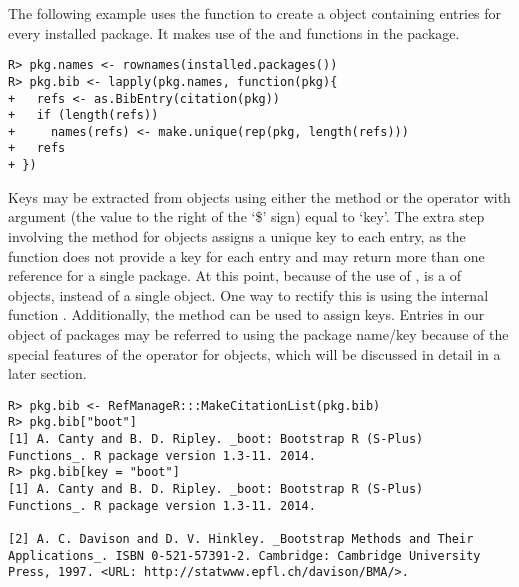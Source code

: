 \documentclass[article]{jss}\usepackage[]{graphicx}\usepackage[]{color}
\makeatletter
\newenvironment{kframe}{%
 \def\at@end@of@kframe{}%
 \ifinner\ifhmode%
  \def\at@end@of@kframe{\end{minipage}}%
  \begin{minipage}{\columnwidth}%
 \fi\fi%
 \def\FrameCommand##1{\hskip\@totalleftmargin \hskip-\fboxsep
 \colorbox{shadecolor}{##1}\hskip-\fboxsep
     \hskip-\linewidth \hskip-\@totalleftmargin \hskip\columnwidth}%
 \MakeFramed {\advance\hsize-\width
   \@totalleftmargin\z@ \linewidth\hsize
   \@setminipage}}%
 {\par\unskip\endMakeFramed%
 \at@end@of@kframe}
\newenvironment{knitrout}{}{} %
\newcommand{\bt}{\`{}}
\makeatother
\begin{document}
The following example uses the function to create a  object containing entries for every installed \R{} package.  It makes use of the  and  functions in the  package.
\begin{knitrout}
\color{fgcolor}\begin{kframe}
\begin{verbatim}
R> pkg.names <- rownames(installed.packages())
R> pkg.bib <- lapply(pkg.names, function(pkg){
+   refs <- as.BibEntry(citation(pkg))
+   if (length(refs))
+     names(refs) <- make.unique(rep(pkg, length(refs)))
+   refs
+ })
\end{verbatim}
\end{kframe}
\end{knitrout}

Keys may be extracted from  objects using either the  method or the \code{\bt$\bt} operator with  argument (the value to the right of the `\$' sign) equal to `key'.  The extra step involving the \code{\bt names<-\bt} method for  objects assigns a unique key to each entry, as the  function does not provide a key for each entry and may return more than one reference for a single package.  At this point, because of the use of ,  is a  of  objects, instead of a single  object.  One way to rectify this is using the internal function .  Additionally, the \code{\bt names<-\bt} method can be used to assign keys.  Entries in our  object of packages may be referred to using the package name/key because of the special features of the \code{\bt[\bt} operator for  objects, which will be discussed in detail in a later section.
\begin{knitrout}
\color{fgcolor}\begin{kframe}
\begin{verbatim}
R> pkg.bib <- RefManageR:::MakeCitationList(pkg.bib)
R> pkg.bib["boot"]
[1] A. Canty and B. D. Ripley. _boot: Bootstrap R (S-Plus)
Functions_. R package version 1.3-11. 2014.
R> pkg.bib[key = "boot"]
[1] A. Canty and B. D. Ripley. _boot: Bootstrap R (S-Plus)
Functions_. R package version 1.3-11. 2014.

[2] A. C. Davison and D. V. Hinkley. _Bootstrap Methods and Their
Applications_. ISBN 0-521-57391-2. Cambridge: Cambridge University
Press, 1997. <URL: http://statwww.epfl.ch/davison/BMA/>.
\end{verbatim}
\end{kframe}
\end{knitrout}
\end{document}
